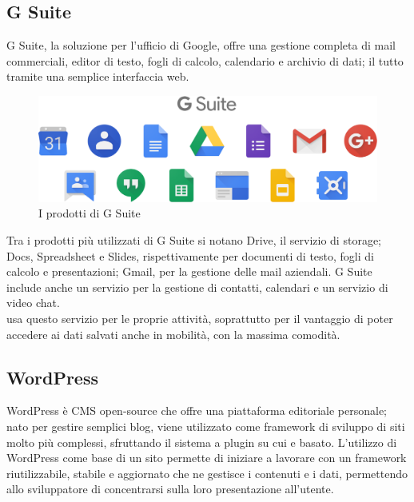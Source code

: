    \subsection{G Suite}
   G Suite, la soluzione per l'ufficio di Google, offre una gestione completa di mail commerciali, editor di testo, fogli di calcolo, calendario e archivio di dati; il tutto tramite una semplice interfaccia web.
   \begin{figure}[H]
      \begin{center}
      \includegraphics[width=16cm,keepaspectratio]{immagini/g-suite-products}
      \end{center}
      \caption{I prodotti di G Suite}
   \end{figure}
   Tra i prodotti più utilizzati di G Suite si notano Drive, il servizio di storage; Docs, Spreadsheet e Slides, rispettivamente per documenti di testo, fogli di calcolo e presentazioni; Gmail, per la gestione delle mail aziendali. G Suite include anche un servizio per la gestione di contatti, calendari e un servizio di video chat.
   \\
   \nomeAzienda{} usa questo servizio per le proprie attività, soprattutto per il vantaggio di poter accedere ai dati salvati anche in mobilità, con la massima comodità.

   \subsection{WordPress}
   WordPress è \gls{CMS} open-source che offre una piattaforma editoriale personale; nato per gestire semplici blog, viene utilizzato come framework di sviluppo di siti molto più complessi, sfruttando il sistema a plugin su cui e basato. L'utilizzo di WordPress come base di un sito permette di iniziare a lavorare con un framework riutilizzabile, stabile e aggiornato che ne gestisce i contenuti e i dati, permettendo allo sviluppatore di concentrarsi sulla loro presentazione all'utente.


